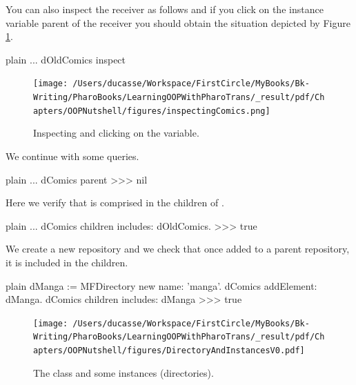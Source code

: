 \documentclass[10pt,twoside,english]{_support/latex/sbabook/sbabook}
\begin{document}
You can also inspect the receiver as follows and if you click on the instance variable parent of the receiver you should obtain the situation depicted by Figure \ref{inspectingComics}.

\begin{displaycode}{plain}
	...
dOldComics inspect
\end{displaycode}


\begin{figure}

\begin{center}
\texttt{[image: /Users/ducasse/Workspace/FirstCircle/MyBooks/Bk-Writing/PharoBooks/LearningOOPWithPharoTrans/\_result/pdf/Chapters/OOPNutshell/figures/inspectingComics.png]}\caption{Inspecting  and clicking on the  variable. \label{inspectingComics}}\end{center}
\end{figure}


We continue with some queries.

\begin{displaycode}{plain}
	...
dComics parent
>>> nil
\end{displaycode}

Here we verify that  is comprised in the children of . 

\begin{displaycode}{plain}
	...
dComics children includes: dOldComics. 
>>> true
\end{displaycode}

We create a new repository and we check that once added to a parent repository, it is included in the 
children.

\begin{displaycode}{plain}
dManga := MFDirectory new name: 'manga'.
dComics addElement: dManga. 
dComics children includes: dManga
>>> true
\end{displaycode}


\begin{figure}

\begin{center}
\texttt{[image: /Users/ducasse/Workspace/FirstCircle/MyBooks/Bk-Writing/PharoBooks/LearningOOPWithPharoTrans/\_result/pdf/Chapters/OOPNutshell/figures/DirectoryAndInstancesV0.pdf]}\caption{The  class and some instances (directories).\label{directories}}\end{center}
\end{figure}
\end{document}
